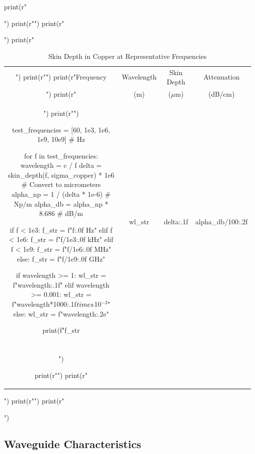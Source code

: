 \documentclass[a4paper, 11pt]{article}
\begin{document}
\begin{pycode}
print(r"\begin{table}[htbp]")
print(r"\centering")
print(r"\caption{Skin Depth in Copper at Representative Frequencies}")
print(r"\begin{tabular}{cccc}")
print(r"\toprule")
print(r"Frequency & Wavelength & Skin Depth & Attenuation \\")
print(r"& (m) & ($\mu$m) & (dB/cm) \\")
print(r"\midrule")

test_frequencies = [60, 1e3, 1e6, 1e9, 10e9]  # Hz

for f in test_frequencies:
    wavelength = c / f
    delta = skin_depth(f, sigma_copper) * 1e6  # Convert to micrometers
    alpha_np = 1 / (delta * 1e-6)  # Np/m
    alpha_db = alpha_np * 8.686  # dB/m

    if f < 1e3:
        f_str = f"{f:.0f} Hz"
    elif f < 1e6:
        f_str = f"{f/1e3:.0f} kHz"
    elif f < 1e9:
        f_str = f"{f/1e6:.0f} MHz"
    else:
        f_str = f"{f/1e9:.0f} GHz"

    if wavelength >= 1:
        wl_str = f"{wavelength:.1f}"
    elif wavelength >= 0.001:
        wl_str = f"{wavelength*1000:.1f}$\\times$10$^{{-3}}$"
    else:
        wl_str = f"{wavelength:.2e}"

    print(f"{f_str} & {wl_str} & {delta:.1f} & {alpha_db/100:.2f} \\\\")

print(r"\bottomrule")
print(r"\end{tabular}")
print(r"\label{tab:skin}")
print(r"\end{table}")
\end{pycode}

\subsection{Waveguide Characteristics}
\end{document}
